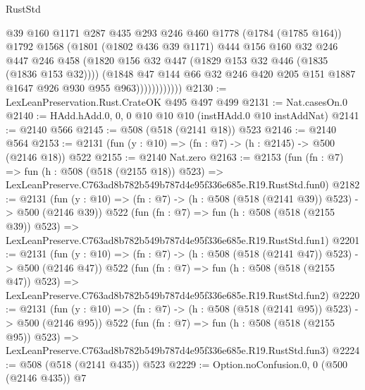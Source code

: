 \begin{lexlean}{RustStd}
\begin{coremodule}
                        @39
                        @160
                        @1171
                        @287
                        @435
                        @293
                        @246
                        @460
                        @1778
                        (@1784 (@1785 @164))
                        @1792
                        @1568
                        (@1801
                          (@1802 @436 @39 @1171)
                          @444
                          @156
                          @160
                          @32
                          @246
                          @447
                          @246
                          @458
                          (@1820 @156 @32 @447 (@1829 @153 @32 @446 (@1835 (@1836 @153 @32))))
                          (@1848
                            @47
                            @144
                            @66
                            @32
                            @246
                            @420
                            @205
                            @151
                            @1887
                            @1647
                            @926
                            @930
                            @955
                            @963))))))))))))
@2130 := LexLeanPreservation.Rust.CrateOK @495 @497 @499
@2131 := Nat.casesOn.{0}
@2140 := HAdd.hAdd.{0, 0, 0} @10 @10 @10 (instHAdd.{0} @10 instAddNat)
@2141 := @2140 @566
@2145 := @508 (@518 (@2141 @18)) @523
@2146 := @2140 @564
@2153 := @2131 (fun (y : @10) => (fn : @7) -> (h : @2145) -> @500 (@2146 @18)) @522
@2155 := @2140 Nat.zero
@2163 := @2153
    (fun (fn : @7) =>
    fun (h : @508 (@518 (@2155 @18)) @523) =>
    LexLeanPreserve.C763ad8b782b549b787d4e95f336e685e.R19.RustStd.fun0)
@2182 := @2131
    (fun (y : @10) => (fn : @7) -> (h : @508 (@518 (@2141 @39)) @523) -> @500 (@2146 @39))
    @522
    (fun (fn : @7) =>
    fun (h : @508 (@518 (@2155 @39)) @523) =>
    LexLeanPreserve.C763ad8b782b549b787d4e95f336e685e.R19.RustStd.fun1)
@2201 := @2131
    (fun (y : @10) => (fn : @7) -> (h : @508 (@518 (@2141 @47)) @523) -> @500 (@2146 @47))
    @522
    (fun (fn : @7) =>
    fun (h : @508 (@518 (@2155 @47)) @523) =>
    LexLeanPreserve.C763ad8b782b549b787d4e95f336e685e.R19.RustStd.fun2)
@2220 := @2131
    (fun (y : @10) => (fn : @7) -> (h : @508 (@518 (@2141 @95)) @523) -> @500 (@2146 @95))
    @522
    (fun (fn : @7) =>
    fun (h : @508 (@518 (@2155 @95)) @523) =>
    LexLeanPreserve.C763ad8b782b549b787d4e95f336e685e.R19.RustStd.fun3)
@2224 := @508 (@518 (@2141 @435)) @523
@2229 := Option.noConfusion.{0, 0} (@500 (@2146 @435)) @7

\end{coremodule}
\end{lexlean}
